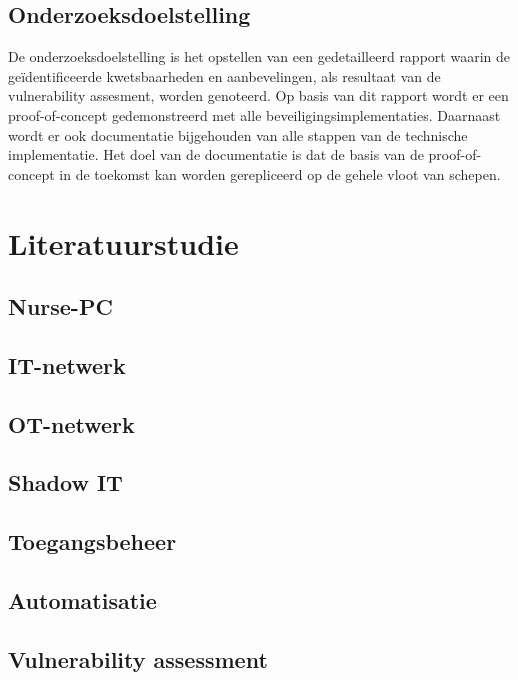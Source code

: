 \subsection{Onderzoeksdoelstelling}
De onderzoeksdoelstelling is het opstellen van een gedetailleerd rapport waarin de geïdentificeerde kwetsbaarheden en aanbevelingen, als resultaat van de vulnerability assesment, worden genoteerd.
Op basis van dit rapport wordt er een proof-of-concept gedemonstreerd met alle beveiligingsimplementaties.
Daarnaast wordt er ook documentatie bijgehouden van alle stappen van de technische implementatie.
Het doel van de documentatie is dat de basis van de proof-of-concept in de toekomst kan worden gerepliceerd op de gehele vloot van schepen.



\section{Literatuurstudie}%
\label{sec:literatuurstudie}
\subsection{Nurse-PC}
\subsection{IT-netwerk}
\subsection{OT-netwerk}
\subsection{Shadow IT}
\subsection{Toegangsbeheer}
\subsection{Automatisatie}
\subsection{Vulnerability assessment}


